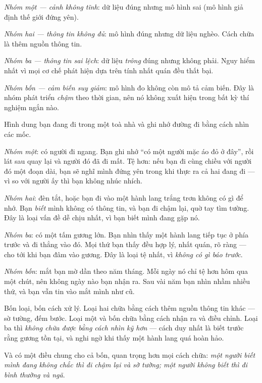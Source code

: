 \documentclass[../../vslam.tex]{subfiles}
\begin{document}
\emph{Nhóm một --- cảnh không tĩnh}: dữ liệu đúng nhưng mô hình sai (mô hình giả định thế giới đứng yên).

\emph{Nhóm hai --- thông tin không đủ}: mô hình đúng nhưng dữ liệu nghèo. Cách chữa là thêm nguồn thông tin.

\emph{Nhóm ba --- thông tin sai lệch}: dữ liệu \emph{trông} đúng nhưng không phải. Nguy hiểm nhất vì mọi cơ chế phát hiện dựa trên tính nhất quán đều thất bại.

\emph{Nhóm bốn --- cảm biến suy giảm}: mô hình đo không còn mô tả cảm biến. Đây là nhóm phát triển \emph{chậm} theo thời gian, nên nó không xuất hiện trong bất kỳ thí nghiệm ngắn nào.

\begin{trucgiac}
Hình dung bạn đang đi trong một toà nhà và ghi nhớ đường đi bằng cách nhìn các mốc.

\emph{Nhóm một}: có người đi ngang. Bạn ghi nhớ ``có một người mặc áo đỏ ở đây'', rồi lát sau quay lại và người đó đã đi mất. Tệ hơn: nếu bạn đi cùng chiều với người đó một đoạn dài, bạn sẽ nghĩ mình đứng yên trong khi thực ra cả hai đang đi --- vì so với người ấy thì bạn không nhúc nhích.

\emph{Nhóm hai}: đèn tắt, hoặc bạn đi vào một hành lang trắng trơn không có gì để nhớ. Bạn \emph{biết} mình không có thông tin, và bạn đi chậm lại, quờ tay tìm tường. Đây là loại vấn đề dễ chịu nhất, vì bạn biết mình đang gặp nó.

\emph{Nhóm ba}: có một tấm gương lớn. Bạn nhìn thấy một hành lang tiếp tục ở phía trước và đi thẳng vào đó. Mọi thứ bạn thấy đều hợp lý, nhất quán, rõ ràng --- cho tới khi bạn đâm vào gương. Đây là loại tệ nhất, vì \emph{không có gì báo trước}.

\emph{Nhóm bốn}: mắt bạn mờ dần theo năm tháng. Mỗi ngày nó chỉ tệ hơn hôm qua một chút, nên không ngày nào bạn nhận ra. Sau vài năm bạn nhìn nhầm nhiều thứ, và bạn vẫn tin vào mắt mình như cũ.

Bốn loại, bốn cách xử lý. Loại hai chữa bằng cách thêm nguồn thông tin khác --- sờ tường, đếm bước. Loại một và bốn chữa bằng cách nhận ra và điều chỉnh. Loại ba thì \emph{không chữa được bằng cách nhìn kỹ hơn} --- cách duy nhất là biết trước rằng gương tồn tại, và nghi ngờ khi thấy một hành lang quá hoàn hảo.

Và có một điều chung cho cả bốn, quan trọng hơn mọi cách chữa: \emph{một người biết mình đang không chắc thì đi chậm lại và sờ tường; một người không biết thì đi bình thường và ngã}.
\end{trucgiac}
\end{document}
